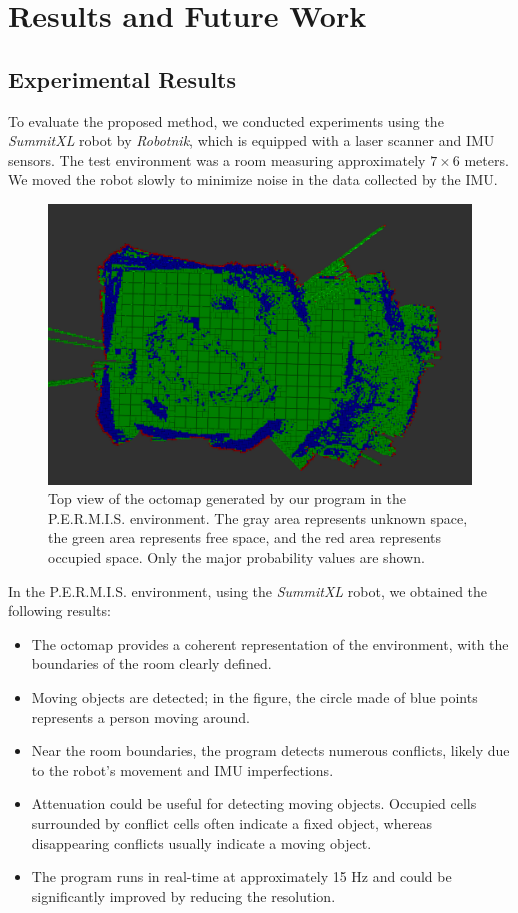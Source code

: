 \chapter{Results and Future Work}

\section{Experimental Results}

To evaluate the proposed method, we conducted experiments using the \textit{SummitXL} robot by \textit{Robotnik}, which is equipped with a laser scanner and IMU sensors. The test environment was a room measuring approximately $7 \times 6$ meters. We moved the robot slowly to minimize noise in the data collected by the IMU.

\begin{figure}[H]
    \centering
    \includegraphics[width=\textwidth]{images/top_screenshot.png}
    \caption{Top view of the octomap generated by our program in the P.E.R.M.I.S. environment. The gray area represents unknown space, the green area represents free space, and the red area represents occupied space. Only the major probability values are shown.}
\end{figure}

In the P.E.R.M.I.S. environment, using the \textit{SummitXL} robot, we obtained the following results:

\begin{itemize}
    \item The octomap provides a coherent representation of the environment, with the boundaries of the room clearly defined.
    \item Moving objects are detected; in the figure, the circle made of blue points represents a person moving around.
    \item Near the room boundaries, the program detects numerous conflicts, likely due to the robot's movement and IMU imperfections.
    \item Attenuation could be useful for detecting moving objects. Occupied cells surrounded by conflict cells often indicate a fixed object, whereas disappearing conflicts usually indicate a moving object.
    \item The program runs in real-time at approximately 15 Hz and could be significantly improved by reducing the resolution.
\end{itemize}

